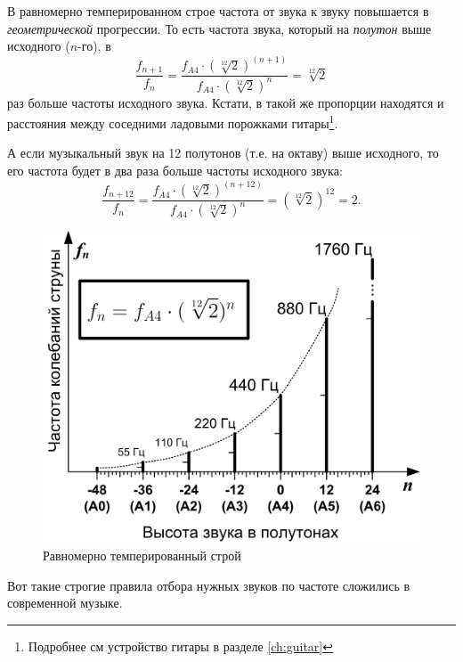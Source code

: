 В равномерно темперированном строе частота от звука к звуку повышается в \emph{геометрической} прогрессии. То есть частота звука, который на \emph{полутон} выше исходного ($n$-го), в 
\[
    \frac{f_{n+1}}{f_n} = \frac{f_{A4}\cdot(\sqrt[12]{2})^{(n+1)}}{f_{A4}\cdot(\sqrt[12]{2})^n} = \sqrt[12]{2}
\] 
раз больше частоты исходного звука. Кстати, в такой же пропорции находятся и расстояния между соседними ладовыми порожками гитары\footnote{Подробнее см устройство гитары в разделе \ref{ch:guitar}}.

А если музыкальный звук на 12 полутонов (т.е. на октаву) выше исходного, то его частота будет в два раза больше частоты исходного звука:
\[
    \frac{f_{n+12}}{f_n} = \frac{f_{A4}\cdot(\sqrt[12]{2})^{(n+12)}}{f_{A4}\cdot(\sqrt[12]{2})^n} = (\sqrt[12]{2})^{12} = 2.
\]

\begin{figure}[!ht]
    \centering
    \includegraphics{fig/tempered} 
    \caption{Равномерно темперированный строй}\label{fig:music:tone:tempered}
\end{figure} 

Вот такие строгие правила отбора нужных звуков по частоте сложились в современной музыке. 

